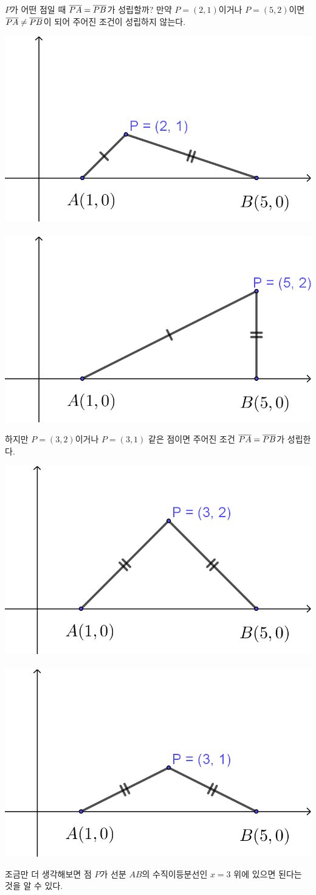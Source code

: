 \documentclass{oblivoir}
\begin{document}
\bigskip
\(P\)가 어떤 점일 때 \(\overline{PA}=\overline{PB}\)가 성립할까?
만약 \(P=(2,1)\)이거나 \(P=(5,2)\)이면 \(\overline{PA}\neq\overline{PB}\)이 되어 주어진 조건이 성립하지 않는다.
\begin{center}
\includegraphics[width=.35\textwidth]{trace_1a}
~~
\includegraphics[width=.35\textwidth]{trace_1b}
\end{center}
하지만 \(P=(3,2)\)이거나 \(P=(3,1)\) 같은 점이면 주어진 조건 \(\overline{PA}=\overline{PB}\)가 성립한다.
\begin{center}
\includegraphics[width=.35\textwidth]{trace_1c}
~~
\includegraphics[width=.35\textwidth]{trace_1d}
\end{center}
조금만 더 생각해보면 점 \(P\)가 선분 \(AB\)의 수직이등분선인 \(x=3\) 위에 있으면 된다는 것을 알 수 있다.
\end{document}
